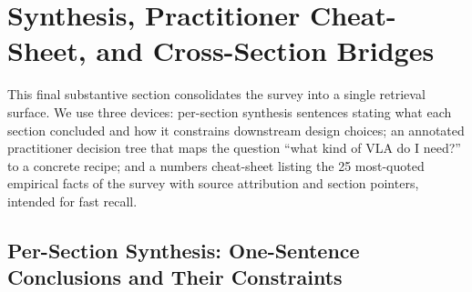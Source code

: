 \documentclass{article}
\begin{document}
\section{Synthesis, Practitioner Cheat-Sheet, and Cross-Section Bridges}\label{synthesis-practitioner-cheat-sheet-and-cross-section-bridges}

This final substantive section consolidates the survey into a single retrieval surface. We use three devices: per-section synthesis sentences stating what each section concluded and how it constrains downstream design choices; an annotated practitioner decision tree that maps the question ``what kind of VLA do I need?'' to a concrete recipe; and a numbers cheat-sheet listing the 25 most-quoted empirical facts of the survey with source attribution and section pointers, intended for fast recall.

\subsection{Per-Section Synthesis: One-Sentence Conclusions and Their Constraints}\label{per-section-synthesis-one-sentence-conclusions-and-their-constraints}
\end{document}
